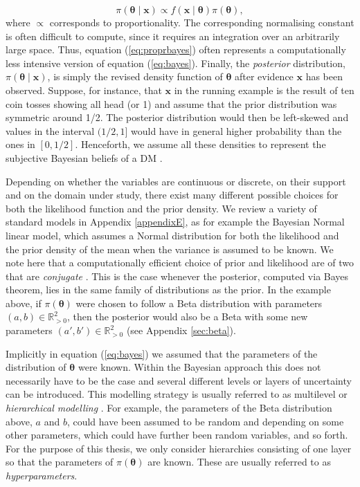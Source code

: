 \begin{equation}
\label{eq:proprbayes}
\pi(\bm{\theta}\;|\;\bm{x})\propto f(\bm{x}\;|\;\bm{\theta})\pi(\bm{\theta}),
\end{equation}
where $\propto$ corresponds to proportionality.  The corresponding normalising constant is often difficult to compute, since it requires an integration over an arbitrarily large space. Thus, equation (\ref{eq:proprbayes}) often represents a computationally less intensive version of equation (\ref{eq:bayes}). Finally, the \textit{posterior} distribution, $\pi(\bm{\theta}\;|\;\bm{x})$, is simply the revised density function of $\bm{\theta}$ after  evidence $\bm{x}$ has been observed. Suppose, for instance, that $\bm{x}$ in the running example is the result of ten coin tosses showing all head (or 1) and assume that the prior distribution was symmetric around 1/2. The posterior distribution would then be left-skewed and values in the interval $(1/2,1]$ would have in general higher probability than the ones in $[0,1/2]$. Henceforth, we assume all these densities to represent the subjective Bayesian beliefs of a DM \citep[for more details on the various interpretation of probabilities and the adequateness of the Bayesian interpretation in decision making, see e.g.][]{O'Hagan2004a,French2000b}.

Depending on whether the variables are continuous or discrete, on their support and  on the domain under study, there exist many different possible choices for both the likelihood function and the prior density. We review a variety of standard models in Appendix \ref{appendixE}, as for example the Bayesian Normal linear model, which assumes a Normal distribution for both the likelihood and the prior density of the mean when the variance is assumed to be known. We note here that a computationally efficient choice of prior and likelihood are of two that are \textit{conjugate} \citep{Bernardo2009, O'Hagan2004a}. This is the case whenever the posterior, computed via Bayes theorem, lies in the same family of distributions as the prior. In the example above, if $\pi(\bm{\theta})$ were chosen to follow a Beta distribution with parameters $(a,b)\in\mathbb{R}^2_{>0}$, then the posterior would also be a Beta with some new parameters $(a',b')\in\mathbb{R}^2_{>0}$ (see Appendix \ref{sec:beta}).

Implicitly in equation (\ref{eq:bayes}) we assumed that the parameters of the distribution of $\bm{\theta}$ were known. Within the Bayesian approach this does not necessarily have to be  the case and several different levels or layers of uncertainty can be introduced. This modelling strategy is usually referred to as multilevel or \textit{hierarchical modelling} \citep{Gelman2006}. For example, the parameters of the Beta distribution above, $a$ and $b$, could have been assumed to be random and depending on some other parameters, which could have further been random variables, and so forth. For the purpose of this thesis, we only consider hierarchies consisting of one layer so that the parameters of $\pi(\bm{\theta})$ are known. These are usually referred to as \textit{hyperparameters}. 

